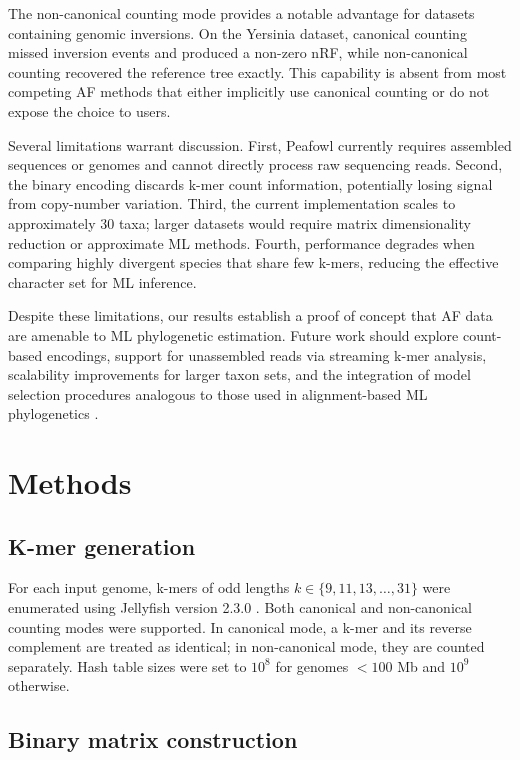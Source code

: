 \documentclass[11pt]{article}
\begin{document}
The non-canonical counting mode provides a notable advantage for datasets containing genomic inversions. On the Yersinia dataset, canonical counting missed inversion events and produced a non-zero nRF, while non-canonical counting recovered the reference tree exactly. This capability is absent from most competing AF methods that either implicitly use canonical counting or do not expose the choice to users.

Several limitations warrant discussion. First, Peafowl currently requires assembled sequences or genomes and cannot directly process raw sequencing reads. Second, the binary encoding discards k-mer count information, potentially losing signal from copy-number variation. Third, the current implementation scales to approximately 30 taxa; larger datasets would require matrix dimensionality reduction or approximate ML methods. Fourth, performance degrades when comparing highly divergent species that share few k-mers, reducing the effective character set for ML inference.

Despite these limitations, our results establish a proof of concept that AF data are amenable to ML phylogenetic estimation. Future work should explore count-based encodings, support for unassembled reads via streaming k-mer analysis, scalability improvements for larger taxon sets, and the integration of model selection procedures analogous to those used in alignment-based ML phylogenetics \citep{huelsenbeck2001}.

\section{Methods}

\subsection{K-mer generation}

For each input genome, k-mers of odd lengths $k \in \{9, 11, 13, \ldots, 31\}$ were enumerated using Jellyfish version 2.3.0 \citep{marcais2011}. Both canonical and non-canonical counting modes were supported. In canonical mode, a k-mer and its reverse complement are treated as identical; in non-canonical mode, they are counted separately. Hash table sizes were set to $10^8$ for genomes $< 100$ Mb and $10^9$ otherwise.

\subsection{Binary matrix construction}
\end{document}
